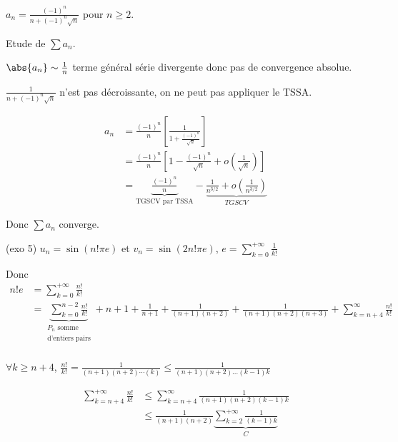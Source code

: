 \begin{exemple}
    $\displaystyle a_n = \frac{(-1)^n}{n + (-1)^n\sqrt{n}}$ pour $n \geqslant 2$. 

    Etude de $\sum a_n$.

    $\abs{a_n} \sim \frac 1 n $ terme général série divergente donc pas de convergence absolue. 

    $\displaystyle \frac 1 {n + (-1)^n \sqrt n}$ n'est pas décroissante, on ne peut pas appliquer le TSSA. 

    \begin{align*}
        a_n & = \frac{(-1)^n} n \left[ \frac 1 {1 + \frac{(-1)^n} {\sqrt n}} \right] \\
            & = \frac{(-1)^n} n \left[ 1 - \frac{(-1)^n}{\sqrt n} + o\left( \frac 1 {\sqrt n} \right) \right] \\
            & = \underbrace{\frac{(-1)^n} n}_{\text{TGSCV par TSSA}} - \underbrace{\frac 1 {n^{3/2}} + o\left( \frac 1 {n^{3/2}} \right)}_{TGSCV}
    \end{align*}
    
    Donc $\sum a_n$ converge.

    \lvspace (exo 5) $u_n = \sin(n! \pi e)$ et $v_n = \sin(2 n! \pi e)$, $\displaystyle e = \sum_{k = 0 }^{ + \infty } \frac{1}{k!}$

    Donc \begin{align*}
        n! e & = \sum_{k = 0 }^{+ \infty } \frac{n!}{k!} \\
              & = \underbrace{\sum_{k = 0}^{n - 2} \frac{n!}{k!}}_{\substack{P_n \text{ somme} \\ \text{d'entiers pairs}}} + n + 1 + \frac{1}{n + 1} + \frac{1}{(n + 1)(n + 2)} + \frac 1 {(n + 1)(n + 2)(n + 3)} + \sum_{k = n + 4 }^{\infty } \frac{n! }{k!} \\
    \end{align*}

    $\displaystyle \forall k \geqslant n + 4$, $\displaystyle \frac{n!}{k!} = \frac{1}{(n + 1)(n + 2) \cdots (k)} \leqslant \frac{1}{(n + 1)(n + 2)\ldots(k - 1)k}$

    \begin{align*}
        \sum_{k = n + 4 }^{+ \infty } \frac{n! }{k!} & \leqslant \sum_{k = n + 4 }^{\infty    }\frac 1 {(n + 1)(n + 2) (k-1)k} \\
                                                    & \leqslant \frac 1 {(n + 1)(n + 2)} \underbrace{\sum_{k = 2 }^{+ \infty } \frac 1 {(k - 1)k}}_C \\
    \end{align*}


\end{exemple}
